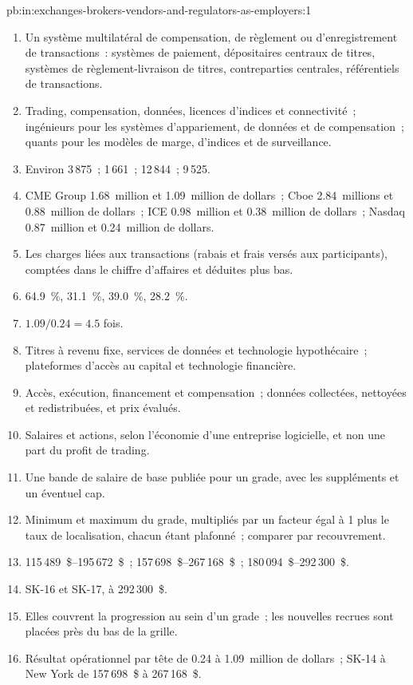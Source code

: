 \begin{solution}{pb:in:exchanges-brokers-vendors-and-regulators-as-employers:1}
\begin{enumerate}
\item Un système multilatéral de compensation, de règlement ou d'enregistrement de transactions~: systèmes de paiement, dépositaires centraux
de titres, systèmes de règlement-livraison de titres, contreparties centrales, référentiels de transactions.
\item Trading, compensation, données, licences d'indices et connectivité~; ingénieurs pour les systèmes d'appariement, de données et de compensation~;
quants pour les modèles de marge, d'indices et de surveillance.
\item Environ 3\,875~; 1\,661~; 12\,844~; 9\,525.
\item CME Group 1.68~million et 1.09~million de dollars~; Cboe 2.84~millions et 0.88~million de dollars~; ICE 0.98~million et 0.38~million de dollars~; Nasdaq 0.87~million et 0.24~million de dollars.
\item Les charges liées aux transactions (rabais et frais versés aux participants), comptées dans le chiffre d'affaires et déduites plus bas.
\item 64.9~\%, 31.1~\%, 39.0~\%, 28.2~\%.
\item $1.09/0.24=4.5$ fois.
\item Titres à revenu fixe, services de données et technologie hypothécaire~; plateformes d'accès au capital et technologie financière.
\item Accès, exécution, financement et compensation~; données collectées, nettoyées et redistribuées, et prix évalués.
\item Salaires et actions, selon l'économie d'une entreprise logicielle, et non une part du profit de trading.
\item Une bande de salaire de base publiée pour un grade, avec les suppléments et un éventuel cap.
\item Minimum et maximum du grade, multipliés par un facteur égal à 1 plus le taux de localisation, chacun étant plafonné~; comparer par recouvrement.
\item 115\,489~\$--195\,672~\$~; 157\,698~\$--267\,168~\$~; 180\,094~\$--292\,300~\$.
\item SK-16 et SK-17, à 292\,300~\$.
\item Elles couvrent la progression au sein d'un grade~; les nouvelles recrues sont placées près du bas de la grille.
\item Résultat opérationnel par tête de 0.24 à 1.09~million de dollars~; SK-14 à New York de 157\,698~\$ à 267\,168~\$.

\end{enumerate}
\end{solution}
